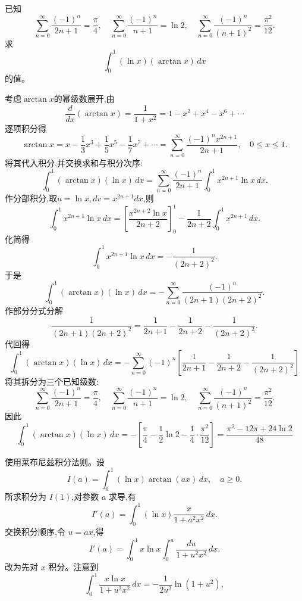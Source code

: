 \begin{questions}
    \question
    已知
    \[
    \sum_{n=0}^{\infty}\frac{(-1)^n}{2n+1}=\frac{\pi}{4},
    \quad
    \sum_{n=0}^{\infty}\frac{(-1)^n}{n+1}=\ln 2,
    \quad
    \sum_{n=0}^{\infty}\frac{(-1)^n}{(n+1)^2}=\frac{\pi^2}{12}.
    \]
    求
    \[
    \int_0^1 (\ln x)(\arctan x)\,dx
    \]
    的值。
    \begin{solution}
        考虑$\arctan x$的幂级数展开,由
        \[
        \frac{d}{dx}(\arctan x)=\frac{1}{1+x^2}=1-x^2+x^4-x^6+\cdots
        \]
        逐项积分得
        \[
        \arctan x=x-\frac{1}{3}x^3+\frac{1}{5}x^5-\frac{1}{7}x^7+\cdots
        =\sum_{n=0}^{\infty}\frac{(-1)^n x^{2n+1}}{2n+1},
        \quad 0\le x\le1.
        \]
        将其代入积分,并交换求和与积分次序:
        \[
        \int_0^1 (\arctan x)(\ln x)\,dx
        =\sum_{n=0}^{\infty}\frac{(-1)^n}{2n+1}
        \int_0^1 x^{2n+1}\ln x\,dx.
        \]
        作分部积分,取$u=\ln x,dv=x^{2n+1}dx$,则
        \[
        \int_0^1 x^{2n+1}\ln x\,dx
        =\left[\frac{x^{2n+2}\ln x}{2n+2}\right]_0^1
        -\frac{1}{2n+2}\int_0^1 x^{2n+1}\,dx.
        \]
        化简得
        \[
        \int_0^1 x^{2n+1}\ln x\,dx=-\frac{1}{(2n+2)^2}.
        \]
        于是
        \[
        \int_0^1 (\arctan x)(\ln x)\,dx
        =-\sum_{n=0}^{\infty}\frac{(-1)^n}{(2n+1)(2n+2)^2}.
        \]
        作部分分式分解
        \[
        \frac{1}{(2n+1)(2n+2)^2}
        =\frac{1}{2n+1}-\frac{1}{2n+2}-\frac{1}{(2n+2)^2}.
        \]
        代回得
        \[
        \int_0^1 (\arctan x)(\ln x)\,dx=-\sum_{n=0}^{\infty}(-1)^n\left[\frac{1}{2n+1}-\frac{1}{2n+2}-\frac{1}{(2n+2)^2}\right]
        \]
        将其拆分为三个已知级数:
        \[
        \sum_{n=0}^{\infty}\frac{(-1)^n}{2n+1}=\frac{\pi}{4},
        \quad
        \sum_{n=0}^{\infty}\frac{(-1)^n}{n+1}=\ln 2,
        \quad
        \sum_{n=0}^{\infty}\frac{(-1)^n}{(n+1)^2}=\frac{\pi^2}{12}.
        \]
        因此
        \[
        \int_0^1 (\arctan x)(\ln x)\,dx
        =-\left[\frac{\pi}{4}-\frac{1}{2}\ln 2-\frac{1}{4}\cdot\frac{\pi^2}{12}\right]
        =\frac{\pi^2-12\pi+24\ln 2}{48}
        \]
    \end{solution}
\begin{solution}
    使用莱布尼兹积分法则。设
    \[
    I(a)=\int_0^1 (\ln x)\arctan(ax)\,dx,
    \quad a\ge0.
    \]
    所求积分为 $I(1)$,对参数 $a$ 求导,有
    \[
    I'(a)=\int_0^1 (\ln x)\frac{x}{1+a^2x^2}\,dx.
    \]
    交换积分顺序,令 $u=ax$,得
    \[
    I'(a)=\int_0^1 x\ln x
    \int_0^{a}\frac{du}{1+u^2x^2}\,dx.
    \]
    改为先对 $x$ 积分。注意到
    \[
    \int_0^1 \frac{x\ln x}{1+u^2x^2}\,dx
    =-\frac{1}{2u^2}\ln(1+u^2),
\]
\end{solution}
\end{questions}
